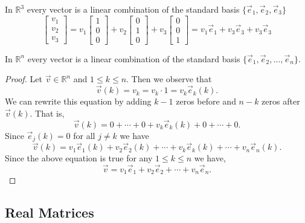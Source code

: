 \begin{example}
In $\mathbb{R}^3 $ every vector is a linear combination of the standard basis 
$\{\vec{e}_1,\vec{e}_2,\vec{e}_3\}$
\[
\begin{bmatrix}v_1 \\ v_2 \\ v_3\end{bmatrix}=
v_1 \begin{bmatrix}1 \\ 0 \\ 0\end{bmatrix}+
v_2 \begin{bmatrix}0 \\ 1 \\ 0\end{bmatrix}+
v_3 \begin{bmatrix}0 \\ 0 \\ 1\end{bmatrix}
=v_1\vec{e}_1+v_3\vec{e}_3+v_3\vec{e}_3
\]
\end{example}

\begin{proposition}
In $\mathbb{R}^n$ every vector is a linear combination of the standard basis 
$\{\vec{e}_1, \vec{e}_2, \ldots, \vec{e}_n\}$.
\end{proposition}

\begin{proof}
Let $\vec{v} \in \mathbb{R}^n$ and $1\leq k\leq n$. Then we observe that  
\[\vec{v}(k)=v_k=v_k\cdot 1=v_k \vec{e}_k(k).\]
We can rewrite this equation by adding $k-1$ zeros before and $n-k$ zeros 
after $\vec{v}(k)$. That is,  
\[\vec{v}(k)=0+ \cdots + 0+v_k\vec{e}_k(k)+0+\cdots+0.\] 
Since $\vec{e}_j(k)=0$ for all $j\neq k$ we have 
\[\vec{v}(k)=v_1\vec{e}_1(k)+v_2\vec{e}_2(k)+\cdots+ v_k\vec{e}_k(k)+ \cdots + 
v_n\vec{e}_n(k).\]
Since the above equation is true for any $1\leq k\leq n$ we have,  
\[\vec{v}=v_1\vec{e}_1+v_2\vec{e}_2+\cdots+ v_n\vec{e}_n.\]
\end{proof}



\subsection{Real Matrices}

